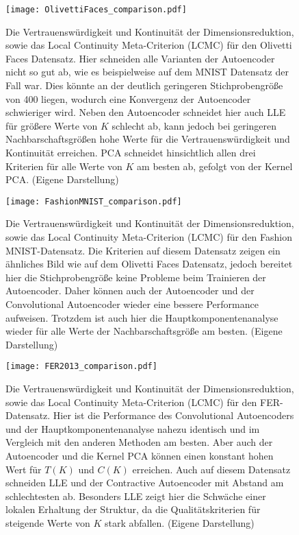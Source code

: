 \begin{figure}[ht]
	\begin{center}
		\texttt{[image: OlivettiFaces\_comparison.pdf]}
	\end{center}
	\caption[Qualitätskriterien für den Olivetti Faces-Datensatz]{Die Vertrauenswürdigkeit und Kontinuität der Dimensionsreduktion, sowie das Local Continuity Meta-Criterion (LCMC) für den Olivetti Faces Datensatz. Hier schneiden alle Varianten der Autoencoder nicht so gut ab, wie es beispielweise auf dem MNIST Datensatz der Fall war. Dies könnte an der deutlich geringeren Stichprobengröße von 400 liegen, wodurch eine Konvergenz der Autoencoder schwieriger wird. Neben den Autoencoder schneidet hier auch LLE für größere Werte von $K$ schlecht ab, kann jedoch bei geringeren Nachbarschaftsgrößen hohe Werte für die Vertrauenswürdigkeit und Kontinuität erreichen. PCA schneidet hinsichtlich allen drei Kriterien für alle Werte von $K$ am besten ab, gefolgt von der Kernel PCA. (Eigene Darstellung)}
	\label{fig:OlivettiFacesMetrics}
\end{figure}

\begin{figure}[ht]
	\begin{center}
		\texttt{[image: FashionMNIST\_comparison.pdf]}
	\end{center}
	\caption[Qualitätskriterien für den Fashion MNIST-Datensatz]{Die Vertrauenswürdigkeit und Kontinuität der Dimensionsreduktion, sowie das Local Continuity Meta-Criterion (LCMC) für den Fashion MNIST-Datensatz. Die Kriterien auf diesem Datensatz zeigen ein ähnliches Bild wie auf dem Olivetti Faces Datensatz, jedoch bereitet hier die Stichprobengröße keine Probleme beim Trainieren der Autoencoder. Daher können auch der Autoencoder und der Convolutional Autoencoder wieder eine bessere Performance aufweisen. Trotzdem ist auch hier die Hauptkomponentenanalyse wieder für alle Werte der Nachbarschaftsgröße am besten. (Eigene Darstellung)}
	\label{fig:FashionMNISTMetrics}
\end{figure}

\begin{figure}[ht]
	\begin{center}
		\texttt{[image: FER2013\_comparison.pdf]}
	\end{center}
	\caption[Qualitätskriterien für den FER-Datensatz]{Die Vertrauenswürdigkeit und Kontinuität der Dimensionsreduktion, sowie das Local Continuity Meta-Criterion (LCMC) für den FER-Datensatz. Hier ist die Performance des Convolutional Autoencoders und der Hauptkomponentenanalyse nahezu identisch und im Vergleich mit den anderen Methoden am besten. Aber auch der Autoencoder und die Kernel PCA können einen konstant hohen Wert für $T(K)$ und $C(K)$ erreichen. Auch auf diesem Datensatz schneiden LLE und der Contractive Autoencoder mit Abstand am schlechtesten ab. Besonders LLE zeigt hier die Schwäche einer lokalen Erhaltung der Struktur, da die Qualitätskriterien für steigende Werte von $K$ stark abfallen. (Eigene Darstellung)}
	\label{fig:FER2013Metrics}
\end{figure}